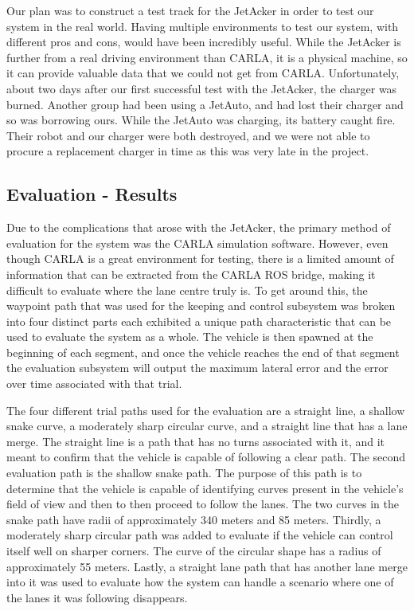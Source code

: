 \documentclass[titlepage, draft]{article}
\begin{document}
{Our plan was to construct a test track for the JetAcker in order to test our system in the real world. Having multiple environments to test our system, with different pros and cons, would have been incredibly useful. While the JetAcker is further from a real driving environment than CARLA, it is a physical machine, so it can provide valuable data that we could not get from CARLA. Unfortunately, about two days after our first successful test with the JetAcker, the charger was burned. Another group had been using a JetAuto, and had lost their charger and so was borrowing ours. While the JetAuto was charging, its battery caught fire. Their robot and our charger were both destroyed, and we were not able to procure a replacement charger in time as this was very late in the project.

\subsection{Evaluation - Results}

Due to the complications that arose with the JetAcker, the primary method of evaluation for the system was the CARLA simulation software. However, even though CARLA is a great environment for testing, there is a limited amount of information that can be extracted from the CARLA ROS bridge, making it difficult to evaluate where the lane centre truly is. To get around this, the waypoint path that was used for the keeping and control subsystem was broken into four distinct parts each exhibited a unique path characteristic that can be used to evaluate the system as a whole. The vehicle is then spawned at the beginning of each segment, and once the vehicle reaches the end of that segment the evaluation subsystem will output the maximum lateral error and the error over time associated with that trial.

The four different trial paths used for the evaluation are a straight line, a shallow snake curve, a moderately sharp circular curve, and a straight line that has a lane merge. The straight line is a path that has no turns associated with it, and it meant to confirm that the vehicle is capable of following a clear path. The second evaluation path is the shallow snake path. The purpose of this path is to determine that the vehicle is capable of identifying curves present in the vehicle's field of view and then to then proceed to follow the lanes. The two curves in the snake path have radii of approximately 340 meters and 85 meters. Thirdly, a moderately sharp circular path was added to evaluate if the vehicle can control itself well on sharper corners. The curve of the circular shape has a radius of approximately 55 meters. Lastly, a straight lane path that has another lane merge into it was used to evaluate how the system can handle a scenario where one of the lanes it was following disappears.

}
\end{document}
